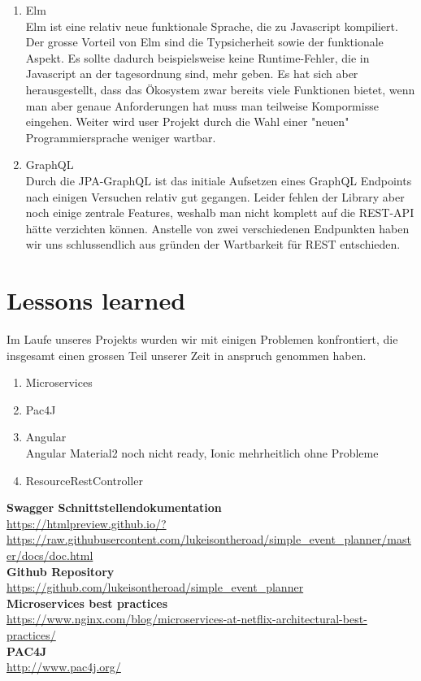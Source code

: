\documentclass[11pt]{article} %
\begin{document}
\begin{enumerate}
\item Elm\\
Elm ist eine relativ neue funktionale Sprache, die zu Javascript kompiliert. Der grosse Vorteil von Elm sind die Typsicherheit sowie der funktionale Aspekt. Es sollte dadurch beispielsweise keine Runtime-Fehler, die in Javascript an der tagesordnung sind, mehr geben.
Es hat sich aber herausgestellt, dass das Ökosystem zwar bereits viele Funktionen bietet, wenn man aber genaue Anforderungen hat muss man teilweise Kompormisse eingehen.
Weiter wird user Projekt durch die Wahl einer "neuen" Programmiersprache weniger wartbar.
\item GraphQL\\
Durch die JPA-GraphQL ist das initiale Aufsetzen eines GraphQL Endpoints nach einigen Versuchen relativ gut gegangen. Leider fehlen der Library aber noch einige zentrale Features, weshalb man nicht komplett auf die REST-API hätte verzichten können. Anstelle von zwei verschiedenen Endpunkten haben wir uns schlussendlich aus gründen der Wartbarkeit für REST entschieden.
\end{enumerate}

\newpage
\section{Lessons learned}
Im Laufe unseres Projekts wurden wir mit einigen Problemen konfrontiert, die insgesamt einen grossen Teil unserer Zeit in anspruch genommen haben.

\begin{enumerate}
\item Microservices\\
\item Pac4J\\
\item Angular\\
Angular Material2 noch nicht ready, Ionic mehrheitlich ohne Probleme
\item ResourceRestController
\end{enumerate}

\newpage
\begin{appendices}

\textbf{Swagger Schnittstellendokumentation}\\
\url{https://htmlpreview.github.io/?https://raw.githubusercontent.com/lukeisontheroad/simple_event_planner/master/docs/doc.html}\\

\textbf{Github Repository}\\
\url{https://github.com/lukeisontheroad/simple_event_planner}\\

\textbf{Microservices best practices}\\
\url{https://www.nginx.com/blog/microservices-at-netflix-architectural-best-practices/}\\

\textbf{PAC4J}\\
\url{http://www.pac4j.org/}\\



\newpage

\end{appendices}
\end{document}
